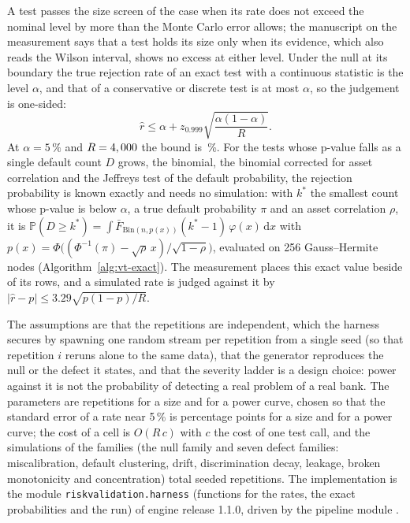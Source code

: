 A test passes the size screen of the case when its rate does not exceed the nominal level by more than the Monte Carlo error allows; the manuscript on the measurement says that a test holds its size only when its evidence, which also reads the Wilson interval, shows no excess at either level. Under the null at its
boundary the true rejection rate of an exact test with a continuous statistic is the level $\alpha$, and that of a conservative or discrete
test is at most $\alpha$, so the judgement is one-sided:
\begin{equation}
\hat r\le \alpha+z_{0.999}\sqrt{\frac{\alpha(1-\alpha)}{R}}.
\label{eq:bs1-size-bound}
\end{equation}
At $\alpha=5\,\%$ and $R=4,000{}$ the bound is \pxOneBound{}\,\%. For the tests whose p-value falls as a single default count $D$
grows, the binomial, the binomial corrected for asset correlation and the Jeffreys test of the default probability, the rejection
probability is known exactly and needs no simulation: with $k^{*}$ the smallest count whose p-value is below $\alpha$, a true default
probability $\pi$ and an asset correlation $\rho$, it is $\mathbb P(D\ge k^{*})=\int \bar F_{\mathrm{Bin}(n,p(x))}(k^{*}-1)\,\varphi(x)\,\mathrm dx$ with
$p(x)=\Phi\big((\Phi^{-1}(\pi)-\sqrt\rho\,x)/\sqrt{1-\rho}\big)$, evaluated on 256 Gauss--Hermite nodes (Algorithm~\ref{alg:vt-exact}). The measurement places this exact value beside
\pxOneExact{} of its rows, and a simulated rate is judged against it by $|\hat r-p|\le 3.29\sqrt{p(1-p)/R}$.

The assumptions are that the repetitions are independent, which the harness secures by spawning one random stream per repetition from a single
seed (so that repetition $i$ reruns alone to the same data), that the generator reproduces the null or the defect it states, and that the
severity ladder is a design choice: power against it is not the probability of detecting a real problem of a real bank. The parameters are
\pxOneNullReps{} repetitions for a size and \pxOneLeakReps{} for a power curve, chosen so that the standard error of a rate near 5\,\% is \pxOneSeNull{}
percentage points for a size and \pxOneSePower{} for a power curve; the cost of a cell is $O(R\,c)$ with $c$ the cost of one test call, and the \pxOneSims{} simulations of the
\pxOneFamilies{} families (the null family and seven defect families: miscalibration, default clustering, drift, discrimination decay, leakage,
broken monotonicity and concentration) total \pxOneReps{} seeded repetitions. The implementation is the module \texttt{riskvalidation.harness}
(functions for the rates, the exact probabilities and the run) of engine release 1.1.0, driven by the pipeline module
.


